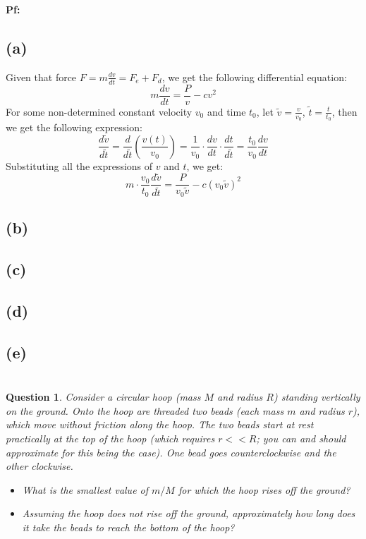 \documentclass{article}
\newtheorem{question}{Question}
\begin{document}
\textbf{Pf:}
\subsection*{(a)}
Given that force $F=m\frac{dv}{dt}=F_e + F_d$, we get the following differential equation:
$$m\frac{dv}{dt}=\frac{P}{v}-cv^2$$
For some non-determined constant velocity $v_0$ and time $t_0$, let $\tilde{v}=\frac{v}{v_0}$, $\tilde{t}=\frac{t}{t_0}$, then we get the following expression:
$$\frac{d\tilde{v}}{d\tilde{t}} = \frac{d}{d\tilde{t}}\left(\frac{v(t)}{v_0}\right) = \frac{1}{v_0}\cdot \frac{dv}{dt}\cdot \frac{dt}{d \tilde{t}} = \frac{t_0}{v_0}\frac{dv}{dt}$$
Substituting all the expressions of $v$ and $t$, we get:
$$m\cdot \frac{v_0}{t_0}\frac{d\tilde{v}}{d\tilde{t}} = \frac{P}{v_0\tilde{v}}-c(v_0\tilde{v})^2$$


\subsection*{(b)}

\subsection*{(c)}

\subsection*{(d)}

\subsection*{(e)}

\break

\section{}%
\begin{question}\label{q4}
    Consider a circular hoop (mass $M$ and radius $R$) standing vertically on the ground. Onto the hoop are threaded two beads (each mass $m$ and radius $r$), which move without friction along the hoop. The two beads start at rest practically at the top of the hoop (which requires $r<<R$; you can and should approximate for this being the case). One bead goes counterclockwise and the other clockwise.
    \begin{itemize}
        \item[(a)] What is the smallest value of $m/M$ for which the hoop rises off the ground?
        \item[(b)] Assuming the hoop does not rise off the ground, approximately how long does it take the beads to reach the bottom of the hoop? 
    \end{itemize}
\end{question}
\end{document}
